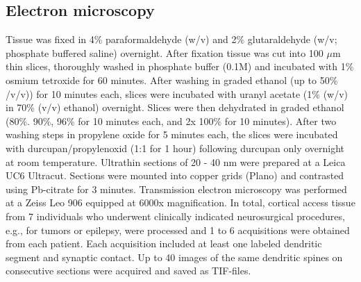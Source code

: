 \documentclass[12pt]{article}
\begin{document}
\subsection*{Electron microscopy} Tissue was fixed in 4\% paraformaldehyde (w/v) and 2\% glutaraldehyde (w/v; phosphate buffered saline) overnight. After fixation tissue was cut into 100 $\mu$m thin slices, thoroughly washed in phosphate buffer (0.1M) and incubated with 1\% osmium tetroxide for 60 minutes. After washing in graded ethanol (up to 50\% /v/v)) for 10 minutes each, slices were incubated with uranyl acetate (1\% (w/v) in 70\% (v/v) ethanol) overnight. Slices were then dehydrated in graded ethanol (80\%. 90\%, 96\% for 10 minutes each, and 2x 100\% for 10 minutes). After two washing steps in propylene oxide for 5 minutes each, the slices were incubated with durcupan/propylenoxid (1:1 for 1 hour) following durcupan only overnight at room temperature. Ultrathin sections of 20 - 40 nm were prepared at a Leica UC6 Ultracut. Sections were mounted into copper grids (Plano) and contrasted using Pb-citrate for 3 minutes. Transmission electron microscopy was performed at a Zeiss Leo 906 equipped at 6000x magnification. In total, cortical access tissue from 7 individuals who underwent clinically indicated neurosurgical procedures, e.g., for tumors or epilepsy, were processed and 1 to 6 acquisitions were obtained from each patient. Each acquisition included at least one labeled dendritic segment and synaptic contact. Up to 40 images of the same dendritic spines on consecutive sections were acquired and saved as TIF-files.
\end{document}
